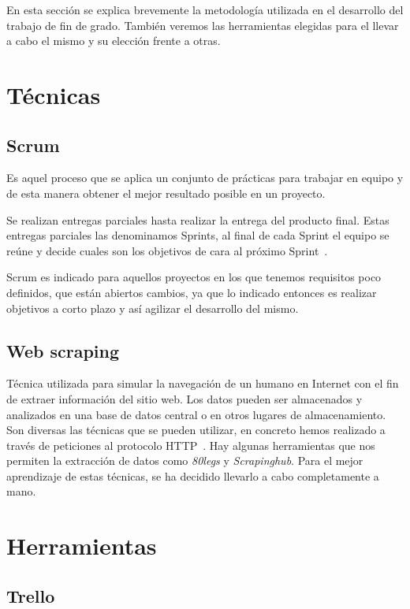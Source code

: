 

En esta sección se explica brevemente la metodología utilizada en el desarrollo del trabajo de fin de grado. También veremos las herramientas elegidas para el llevar a cabo el mismo y su elección frente a otras.

\section{Técnicas}

\subsection{Scrum} 
Es aquel proceso que se aplica un conjunto de prácticas para trabajar en equipo y de esta manera obtener el mejor resultado posible en un proyecto.

Se realizan entregas parciales hasta realizar la entrega del producto final. Estas entregas parciales las denominamos Sprints, al final de cada Sprint el equipo se reúne y decide cuales son los objetivos de cara al próximo Sprint~\cite{mckenna2016agile}.

Scrum es indicado para aquellos proyectos en los que  tenemos requisitos poco definidos, que están abiertos cambios, ya que lo indicado entonces es realizar objetivos a corto plazo y así  agilizar el desarrollo del mismo.

\subsection{Web scraping}

Técnica utilizada para simular  la navegación de un humano en Internet con el fin de extraer información del sitio web. Los datos pueden ser almacenados y analizados en una base de datos central o en otros lugares de almacenamiento.  Son diversas las técnicas que se pueden utilizar, en concreto hemos realizado a través de peticiones al protocolo HTTP~\cite{wiki:scraping}. Hay algunas herramientas que nos permiten la extracción de datos como \textit{80legs} y \textit{Scrapinghub}. Para el mejor aprendizaje de estas técnicas, se ha decidido llevarlo a cabo completamente a mano.

\section{Herramientas}

\subsection{Trello}

